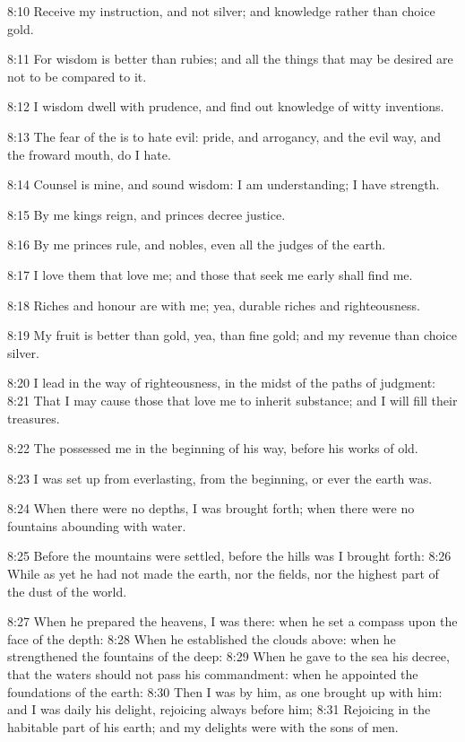 8:10 Receive my instruction, and not silver; and knowledge rather than choice gold.

8:11 For wisdom is better than rubies; and all the things that may be desired are not to be compared to it.

8:12 I wisdom dwell with prudence, and find out knowledge of witty inventions.

8:13 The fear of the \LORD is to hate evil: pride, and arrogancy, and the evil way, and the froward mouth, do I hate.

8:14 Counsel is mine, and sound wisdom: I am understanding; I have strength.

8:15 By me kings reign, and princes decree justice.

8:16 By me princes rule, and nobles, even all the judges of the earth.

8:17 I love them that love me; and those that seek me early shall find me.

8:18 Riches and honour are with me; yea, durable riches and righteousness.

8:19 My fruit is better than gold, yea, than fine gold; and my revenue than choice silver.

8:20 I lead in the way of righteousness, in the midst of the paths of judgment: 8:21 That I may cause those that love me to inherit substance; and I will fill their treasures.

8:22 The \LORD possessed me in the beginning of his way, before his works of old.

8:23 I was set up from everlasting, from the beginning, or ever the earth was.

8:24 When there were no depths, I was brought forth; when there were no fountains abounding with water.

8:25 Before the mountains were settled, before the hills was I brought forth: 8:26 While as yet he had not made the earth, nor the fields, nor the highest part of the dust of the world.

8:27 When he prepared the heavens, I was there: when he set a compass upon the face of the depth: 8:28 When he established the clouds above: when he strengthened the fountains of the deep: 8:29 When he gave to the sea his decree, that the waters should not pass his commandment: when he appointed the foundations of the earth: 8:30 Then I was by him, as one brought up with him: and I was daily his delight, rejoicing always before him; 8:31 Rejoicing in the habitable part of his earth; and my delights were with the sons of men.


